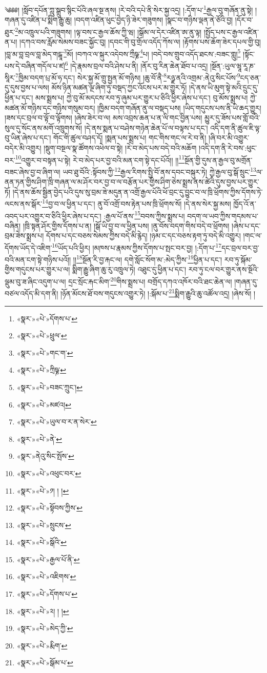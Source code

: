 ༄༅༅། །སློབ་དཔོན་ཀླུ་སྒྲུབ་སྙིང་པོའི་ཞལ་སྔ་ནས། །རེ་བའི་དཔེ་ནི་སེར་སྐྱ་འདྲ། །:དོག་པ་\footnote{«སྣར་»«པེ་»དོགས་པ་}རྒྱལ་བུ་གཞོན་ནུ་སྟེ། །གཞན་དུ་འཛིན་པ་སྨིག་རྒྱུ་ཆུ། །བདག་འཛིན་ཕུང་བྱེད་ཉི་ཟེར་གཟུགས། །སྣང་བ་གཉིས་ལྡན་ནེ་ཙོའི་བྱ། །དོར་བ་ཐུར་\footnote{«སྣར་»«པེ་»ཕྲུལ་}མ་འཁྲུལ་པའི་གཟུགས། །ལྟ་བས་ང་རྒྱལ་ཆོས་ཀྱི་ཝ། །སྒོམ་ལ་དེར་འཛིན་ཨ་ནུ་ལྟ། །སྤྱོད་པས་ང་རྒྱལ་འཛིན་ན་པ། །དཀའ་བས་རློམ་སེམས་བཟང་སྐྱོང་བུ། །དབང་གི་བུ་གྲོལ་འདོད་ཀོས་ལ། །རྟོགས་པས་ཆོག་ཟེར་དཔལ་གྱི་བུ། །བླ་མ་བླ་བྲལ་བླ་མེད་གངྒཱ་\footnote{«སྣར་»«པེ་»གང་ག་}མོ། །བཀའ་ལ་སྐུར་འདེབས་ཀྲྀཥྞ་\footnote{«སྣར་»«པེ་»ཀྲིཥྞ་}པ། །བདེ་བས་གྲུབ་འདོད་ཐངས་:བཟང་གླུ།\footnote{«སྣར་»«པེ་»བཟང་ཀྲུང་།} །སྟོང་པས་དེ་བཞིན་གདོལ་པ་ཛ།\footnote{«སྣར་»«པེ་»མཛའ།} །དེ་རྣམས་བྲལ་བའི་ཤེས་པ་ནི། །ནོར་བུ་རིན་ཆེན་ཐོབ་པ་འདྲ། །སྔོན་:ཡུལ་ཝཱ་རཱ་ཎ་སཱིར་\footnote{«སྣར་»«པེ་»ཡུལ་བ་ར་ན་སེར་}ཁྱིམ་བདག་པྲ་མོ་ཧ་དང་། སེར་སྐྱ་མོ་གྲུ་སྤྱན་མོ་གཉིས། །ཆུ་བོ་ནཻ་\footnote{«སྣར་»«པེ་»ནེ་}རཉྫ་ནའི་འགྲམ་:ནེའུ་སིང་པོས་\footnote{«སྣར་»ནེའུ་སིང་སྤོས་}ངད་ཅན་དུ་དུས་བྱས་པ་ལས། མོས་ཉིན་མཚན་ལྔ་ཞིག་ཏུ་བསྡད་ཀྱང་འོངས་པར་མ་གྱུར་ཏོ། །དེ་ནས་ཡི་མུག་སྟེ་མའི་དྲུང་དུ་ཕྱིན་པ་དང་། མས་སྨྲས་པ། ཀྱེ་བུ་མོ་མདངས་རབ་ཏུ་ཞུམ་པར་གྱུར་པ་ཅིའི་ཕྱིར་ཞེས་པ་དང་། བུ་མོས་སྨྲས་པ། ཀྱེ་མཚན་མོ་གཉིས་དང་གཉིས་གསུམ་བར། །ཁྱིམ་བདག་གཞོན་ནུ་ལ་བསྡད་པས། །ཡིད་གདུངས་པས་ནི་ཡི་ཆད་གྱུར། །ཟས་དང་བྲལ་བ་ལྟོ་བ་ལྟོགས། །ཞེས་ཟེར་བ་ལ། མས་འབྲས་ཆན་པ་ན་ལི་གང་བྱིན་པས། མྱུར་དུ་ཟོས་པས་གློ་བའི་སུལ་དུ་སོང་ནས་མགོ་འཁྲུགས་སོ། །དེ་ནས་སྨན་པ་བཤེས་གཉེན་ཆེན་པོ་ལ་བལྟས་པ་དང་། འདི་དག་ནི་ཚུལ་ཇི་ལྟ་བུ་ཡིན་ཞེས་པ་དང་། གོང་གི་ཚུལ་བཤད་དོ། །སྨན་པས་སྨྲས་པ། གང་གིས་གང་ལ་རེ་བ་ནི། །ཞི་བར་མི་འགྱུར་བདེར་མི་འགྱུར། །སྡུག་བསྔལ་སྣ་ཚོགས་འཕེལ་བ་སྟེ། །རེ་བ་མེད་པས་བདེ་བའི་མཆོག །འདི་དག་ནི་རེ་བས་:ཕུང་བར་\footnote{«སྣར་»«པེ་»འཕུང་བར་}འགྱུར་བ་བསྟན་པ་སྟེ། རེ་བ་མེད་པར་བྱ་བའི་མན་ངག་སྟེ་དང་པོའོ།། །།\footnote{«སྣར་»«པེ་»༡། ། །}སྔོན་གྱི་དུས་ན་རྒྱལ་བུ་མགྲོན་བཟང་ཞེས་བྱ་བ་ཞིག་ལ། ཡབ་ཐུ་བོའི་:སྟོབས་ཀྱི་\footnote{«སྣར་»«པེ་»སྟོབས་ཀྱིས་}རྒྱལ་རིགས་སྤྱི་བོ་ནས་དབང་བསྐུར་ཏེ། ཀྱེ་རྒྱལ་བུ་སྒོ་སྲུང་\footnote{«སྣར་»«པེ་»སྲུངས་}ལ་ནན་ཏན་གྱིས་ཤིག་ཁྲི་གཞན་ལ་མ་ཤོར་བར་བྱ་བ་ལ་བརྩོན་པར་གྱིས་ཤིག་ཅེས་སྨྲས་ནས་ཚེའི་དུས་བྱས་པར་གྱུར་ཏོ། །དེ་ནས་ཆོས་སྦྱིན་བྱེད་པའི་དུས་སུ་བྲམ་ཟེ་མདུན་ན་འགྲོ་རྒྱལ་པོའི་ཕོ་བྲང་དུ་བྱུང་བ་ལ་ཁྲི་ཕྲོགས་ཀྱིས་དོགས་ཏེ་ལངས་ནས་སྒོར་\footnote{«སྣར་»«པེ་»སྒོའི་}བྱ་བ་ལ་ཕྱིན་པ་དང་། ནུ་བོ་འགྲོ་བས་རྟེན་པས་ཁྲི་ཕྲོགས་སོ། །དེ་ནས་སེར་སྐྱ་མས། ཁྱོད་འོ་ན་འབད་པར་འགྱུར་བ་ཅིའི་ཕྱིར་ཞེས་པ་དང་། :རྒྱལ་པོ་ནས་\footnote{«སྣར་»«པེ་»རྒྱལ་པོ་ནི་}བབས་ཀྱིས་སྨྲས་པ། བདག་ལ་ཡབ་ཀྱིས་གདམས་པ་བཞིན། །ཁྲི་སྟན་ཤོར་གྱིས་དོགས་པ་ན། །སྒོ་ཡི་བྱ་བ་ལ་ཕྱིན་པས། །ནུ་བོས་བདག་གིས་བདེ་བ་ཕྲོགས། །ཞེས་པ་དང་བྲམ་ཟེས་སྨྲས་པ། དོགས་པ་དང་བཅས་སེམས་ཀྱིས་བདེ་མི་རྙེད། །ཉམ་ང་དང་བཅས་རྟག་ཏུ་བདེ་མི་འགྱུར། །གང་ལ་དོགས་ཡོད་དེ་འཇིག་\footnote{«སྣར་»«པེ་»འཇིགས་}ཡོད་པའི་ཕྱིར། །མཁས་པ་རྣམས་ཀྱིས་དོགས་པ་སྤང་བར་བྱ། །:དོག་པ་\footnote{«སྣར་»«པེ་»དོགས་པ་}དང་བྲལ་བར་བྱ་བའི་མན་ངག་སྟེ་གཉིས་པའོ།། །།\footnote{«སྣར་»«པེ་»༢། ། །}སྔོན་རི་བྱ་རྐང་ལ། དགེ་སློང་སོག་མ་:མེད་ཀྱིས་\footnote{«སྣར་»«པེ་»མེད་ཀྱི་}ཕྱིན་པ་དང་། རབ་ཏུ་སྐོམ་གྱིས་གདུངས་པར་གྱུར་པ་ལ། སྨིག་རྒྱུ་ཞིག་ཆུ་རུ་འཁྲུལ་ཏེ། འཐུང་དུ་ཕྱིན་པ་དང་། རབ་ཏུ་ངལ་བར་གྱུར་ནས་སྔོའི་ལྡུམ་བུ་ཟ་ཞིང་འདུག་པ་ལ། དྲང་སྲོང་རྐང་མིག་\footnote{«སྣར་»«པེ་»རྨིག་}གིས་སྨྲས་པ། བགྲོད་དཀའ་འཁོར་བའི་ཐང་ཆེན་ལ། །གཞན་དུ་བཙལ་འདོད་མི་དག་ནི། །ཉོན་མོངས་ཐོ་བས་གདུངས་འགྱུར་ཏེ། །:སྐོམ་པ་\footnote{«སྣར་»«པེ་»སྒོམ་པ་}སྨིག་རྒྱུའི་ཆུ་འཚོལ་འདྲ། །ཞེས་སོ། །
